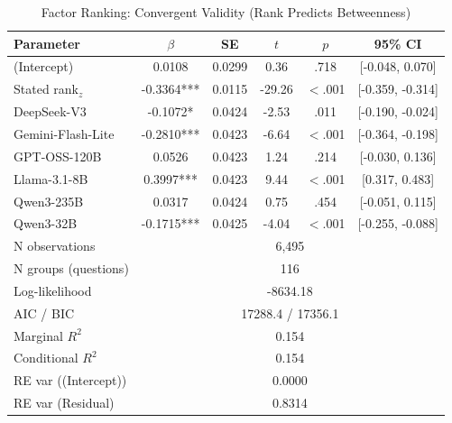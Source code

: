 \begin{table}[htbp]
\centering
\small
\caption{Factor Ranking: Convergent Validity (Rank Predicts Betweenness)}
\label{tab:lme_ranking_convergent_table}
\begin{tabular}{lccccc}
\toprule
Parameter & $\beta$ & SE & $t$ & $p$ & 95\% CI \\
\midrule
  (Intercept) & 0.0108 & 0.0299 & 0.36 & .718 & [-0.048, 0.070] \\
  Stated rank$_z$ & -0.3364*** & 0.0115 & -29.26 & $<$.001 & [-0.359, -0.314] \\
  DeepSeek-V3 & -0.1072* & 0.0424 & -2.53 & .011 & [-0.190, -0.024] \\
  Gemini-Flash-Lite & -0.2810*** & 0.0423 & -6.64 & $<$.001 & [-0.364, -0.198] \\
  GPT-OSS-120B & 0.0526 & 0.0423 & 1.24 & .214 & [-0.030, 0.136] \\
  Llama-3.1-8B & 0.3997*** & 0.0423 & 9.44 & $<$.001 & [0.317, 0.483] \\
  Qwen3-235B & 0.0317 & 0.0424 & 0.75 & .454 & [-0.051, 0.115] \\
  Qwen3-32B & -0.1715*** & 0.0425 & -4.04 & $<$.001 & [-0.255, -0.088] \\
\midrule
  N observations & \multicolumn{5}{c}{6{,}495} \\
  N groups (questions) & \multicolumn{5}{c}{116} \\
  Log-likelihood & \multicolumn{5}{c}{-8634.18} \\
  AIC / BIC & \multicolumn{5}{c}{17288.4 / 17356.1} \\
  Marginal $R^2$ & \multicolumn{5}{c}{0.154} \\
  Conditional $R^2$ & \multicolumn{5}{c}{0.154} \\
  RE var ((Intercept)) & \multicolumn{5}{c}{0.0000} \\
  RE var (Residual) & \multicolumn{5}{c}{0.8314} \\
\bottomrule
\end{tabular}
\end{table}
